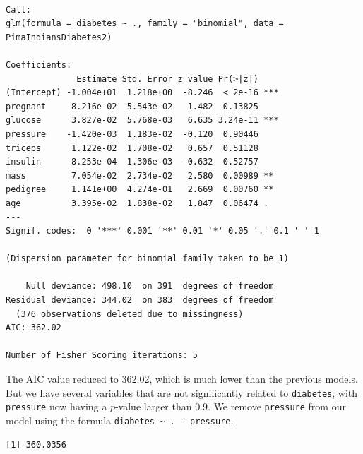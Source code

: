 \documentclass[
  letterpaper,
  DIV=11,
  numbers=noendperiod]{scrreprt}
\newenvironment{Shaded}{\begin{snugshade}}{\end{snugshade}}
\newcommand{\AttributeTok}[1]{\textcolor[rgb]{0.40,0.45,0.13}{#1}}
\newcommand{\FunctionTok}[1]{\textcolor[rgb]{0.28,0.35,0.67}{#1}}
\newcommand{\NormalTok}[1]{\textcolor[rgb]{0.00,0.23,0.31}{#1}}
\newcommand{\OtherTok}[1]{\textcolor[rgb]{0.00,0.23,0.31}{#1}}
\newcommand{\SpecialCharTok}[1]{\textcolor[rgb]{0.37,0.37,0.37}{#1}}
\newcommand{\StringTok}[1]{\textcolor[rgb]{0.13,0.47,0.30}{#1}}
\begin{document}
\begin{verbatim}

Call:
glm(formula = diabetes ~ ., family = "binomial", data = PimaIndiansDiabetes2)

Coefficients:
              Estimate Std. Error z value Pr(>|z|)    
(Intercept) -1.004e+01  1.218e+00  -8.246  < 2e-16 ***
pregnant     8.216e-02  5.543e-02   1.482  0.13825    
glucose      3.827e-02  5.768e-03   6.635 3.24e-11 ***
pressure    -1.420e-03  1.183e-02  -0.120  0.90446    
triceps      1.122e-02  1.708e-02   0.657  0.51128    
insulin     -8.253e-04  1.306e-03  -0.632  0.52757    
mass         7.054e-02  2.734e-02   2.580  0.00989 ** 
pedigree     1.141e+00  4.274e-01   2.669  0.00760 ** 
age          3.395e-02  1.838e-02   1.847  0.06474 .  
---
Signif. codes:  0 '***' 0.001 '**' 0.01 '*' 0.05 '.' 0.1 ' ' 1

(Dispersion parameter for binomial family taken to be 1)

    Null deviance: 498.10  on 391  degrees of freedom
Residual deviance: 344.02  on 383  degrees of freedom
  (376 observations deleted due to missingness)
AIC: 362.02

Number of Fisher Scoring iterations: 5
\end{verbatim}

The AIC value reduced to 362.02, which is much lower than the previous
models. But we have several variables that are not significantly related
to \texttt{diabetes}, with \texttt{pressure} now having a \(p\)-value
larger than 0.9. We remove \texttt{pressure} from our model using the
formula \texttt{diabetes\ \textasciitilde{}\ .\ -\ pressure}.

\begin{Shaded}
\end{Shaded}

\begin{verbatim}
[1] 360.0356
\end{verbatim}
\end{document}
